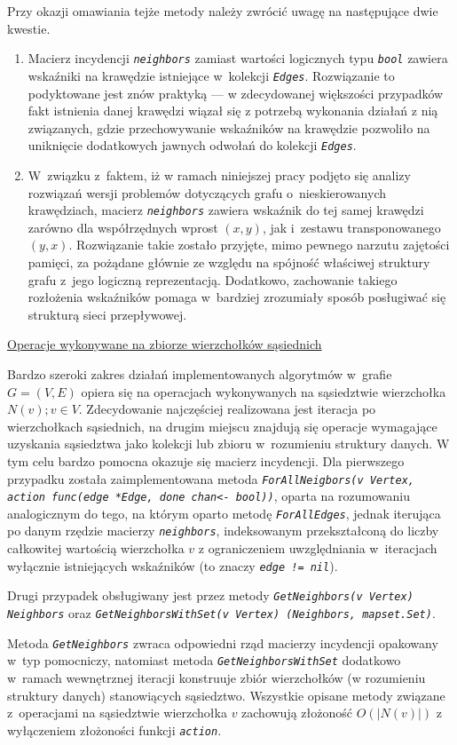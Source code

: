 {{      Przy okazji omawiania tejże metody należy zwrócić uwagę na następujące dwie kwestie.
      \begin{enumerate}
        \item Macierz incydencji \textit{\lstinline{neighbors}} zamiast wartości logicznych typu \textit{\lstinline{bool}} zawiera wskaźniki na krawędzie istniejące w~kolekcji \textit{\lstinline{Edges}}.
        Rozwiązanie to podyktowane jest znów praktyką --- w zdecydowanej większości przypadków fakt istnienia danej krawędzi wiązał się z potrzebą wykonania działań z nią związanych, gdzie przechowywanie wskaźników na krawędzie pozwoliło na uniknięcie dodatkowych jawnych odwołań do kolekcji \textit{\lstinline{Edges}}.
        \item W~związku z~faktem, iż w ramach niniejszej pracy podjęto się analizy rozwiązań wersji problemów dotyczących grafu o~nieskierowanych krawędziach, macierz \textit{\lstinline{neighbors}} zawiera wskaźnik do tej samej krawędzi zarówno dla współrzędnych wprost $(x, y)$, jak i~zestawu transponowanego $(y, x)$.
        Rozwiązanie takie zostało przyjęte, mimo pewnego narzutu zajętości pamięci, za pożądane głównie ze względu na spójność właściwej struktury grafu z~jego logiczną reprezentacją.
        Dodatkowo, zachowanie takiego rozłożenia wskaźników pomaga w~bardziej zrozumiały sposób posługiwać się strukturą sieci przepływowej.
      \end{enumerate}
  }
  \underline{Operacje wykonywane na zbiorze wierzchołków sąsiednich}\\
  \par{
    Bardzo szeroki zakres działań implementowanych algorytmów w~grafie $G=(V,E)$ opiera się na operacjach wykonywanych na sąsiedztwie wierzchołka $N(v); v \in V$.
    Zdecydowanie najczęściej realizowana jest iteracja po wierzchołkach sąsiednich, na drugim miejscu znajdują się operacje wymagające uzyskania sąsiedztwa jako kolekcji lub zbioru w~rozumieniu struktury danych.
    W tym celu bardzo pomocna okazuje się macierz incydencji.
    Dla pierwszego przypadku została zaimplementowana metoda \textit{\lstinline{ForAllNeigbors(v Vertex, action func(edge *Edge, done chan<- bool))}}, oparta na rozumowaniu analogicznym do tego, na którym oparto metodę \textit{\lstinline{ForAllEdges}}, jednak iterująca po danym rzędzie macierzy \textit{\lstinline{neighbors}}, indeksowanym przekształconą do liczby całkowitej wartością wierzchołka $v$ z ograniczeniem uwzględniania w~iteracjach wyłącznie istniejących wskaźników (to znaczy \textit{\lstinline{edge != nil}}).

    Drugi przypadek obsługiwany jest przez metody \textit{\lstinline{GetNeighbors(v Vertex) Neighbors}} oraz \textit{\lstinline{GetNeighborsWithSet(v Vertex) (Neighbors, mapset.Set)}}.

    Metoda \textit{\lstinline{GetNeighbors}} zwraca odpowiedni rząd macierzy incydencji opakowany w~typ pomocniczy, natomiast metoda \textit{\lstinline{GetNeighborsWithSet}} dodatkowo w~ramach wewnętrznej iteracji konstruuje zbiór wierzchołków (w rozumieniu struktury danych) stanowiących sąsiedztwo.
    Wszystkie opisane metody związane z~operacjami na sąsiedztwie wierzchołka $v$ zachowują złożoność $O(|N(v)|)$ z wyłączeniem złożoności funkcji \textit{\lstinline{action}}.
  }
}
